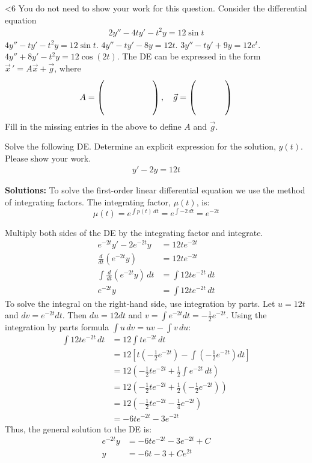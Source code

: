 \ifnum \Version<6 
\question[2] You do not need to show your work for this question. Consider the differential equation 
\ifnum {}
\begin{align*}
    2y'' - 4ty' - t^2y = 12\sin t
\end{align*}
\fi
\ifnum {}
$4y'' - ty' - t^2y = 12\sin t$.
\fi
\ifnum {}
$4y'' - ty' - 8y = 12t$.
\fi
\ifnum {}
$3y'' - ty' + 9y = 12e^t$.
\fi
\ifnum {}
$4y'' + 8y' - t^2y = 12\cos(2t)$.
\fi
The DE can be expressed in the form $\vec x\, ' = A\vec x + \vec g$, where 
\begin{align*}
 A = \left( \hbox to 2cm{\vbox to 0.85cm{}} \right), \quad \vec g = \left( \hbox to 1.2cm{\vbox to 0.85cm{}} \right)
\end{align*}
Fill in the missing entries in the above to define $A$ and $\vec g$. 
\fi 

\ifnum {}
\question[5] Solve the following DE. Determine an explicit expression for the solution, $y(t)$. Please show your work. 
\begin{align*}
    y'-2y=12t
\end{align*}
\ifnum {} {\color{DarkBlue} 
\textbf{Solutions:} To solve the first-order linear differential equation we use the method of integrating factors. The integrating factor, \( \mu(t) \), is:
\[
\mu(t) = e^{\int p(t) \, dt} = e^{\int -2 \, dt} = e^{-2t}
\]

Multiply both sides of the DE by the integrating factor and integrate. 
\begin{align}
e^{-2t} y' - 2 e^{-2t} y &= 12t e^{-2t}\\
\frac{d}{dt} \left( e^{-2t} y \right) &= 12t e^{-2t}\\
\int \frac{d}{dt} \left( e^{-2t} y \right) \, dt &= \int 12t e^{-2t} \, dt\\
e^{-2t} y &= \int 12t e^{-2t} \, dt
\end{align}
To solve the integral on the right-hand side, use integration by parts. Let \( u = 12t \) and \( dv = e^{-2t} dt \). Then \( du = 12 dt \) and \( v = \int e^{-2t} dt = -\frac{1}{2} e^{-2t} \). Using the integration by parts formula \(\int u \, dv = uv - \int v \, du\):
\begin{align}
    \int 12t e^{-2t} \, dt &= 12 \int t e^{-2t} \, dt \\
&= 12 \left[ t \left( -\frac{1}{2} e^{-2t} \right) - \int \left( -\frac{1}{2} e^{-2t} \right) dt \right]\\
&= 12 \left( -\frac{1}{2} t e^{-2t} + \frac{1}{2} \int e^{-2t} \, dt \right)\\
&= 12 \left( -\frac{1}{2} t e^{-2t} + \frac{1}{2} \left( -\frac{1}{2} e^{-2t} \right) \right)\\
&= 12 \left( -\frac{1}{2} t e^{-2t} - \frac{1}{4} e^{-2t} \right)\\
&= -6t e^{-2t} - 3 e^{-2t}
\end{align}
Thus, the general solution to the DE is:
\begin{align}
    e^{-2t} y &= -6t e^{-2t} - 3 e^{-2t} + C\\
y &= -6t - 3 + Ce^{2t}
\end{align}

} 
\else 
\fi
\fi

